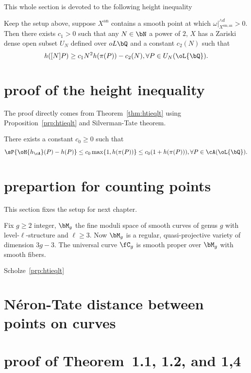 This whole section is devoted to the following height inequality
\begin{prp}\label{prp:htieqlt}
  Keep the setup above, suppose $X^{\mathrm{an}}$ contains a smooth point at which $\omega|_{X^{\mathrm{sm,an}}}^{\wedge d}>0$. Then there exists $c_{1}>0$ such that any $N\in\bN$ a power of $2$, $X$ has a Zariski dense open subset $U_{N}$ defined over $oL{\bQ}$ and a constant $c_{2}(N)$ such that
  \[
    h([N]P)\geq c_{1}N^{2}h(\pi(P))-c_{2}(N), \forall P\in U_{N}(\oL{\bQ}).
  \]
\end{prp}



\section{proof of the height inequality}

The proof directly comes from Theorem~\ref{thm:htieqlt} using Proposition~\ref{prp:htieqlt} and Silverman-Tate theorem.

\begin{thm}
  There exists a constant $c_{0}\geq 0$ such that
  \[
    \sP{\oH{h_{\cA}}(P)-h(P)}\leq c_{0}\max\{1, h(\pi(P))\}\leq c_{0}(1+h(\pi(P))), \forall P\in\cA(\oL{\bQ}).
  \]
\end{thm}


\section{prepartion for counting points}

This section fixes the setup for next chapter.
\begin{stp}
  Fix $g\geq 2$ integer, $\bM_{g}$ the fine moduli space of smooth curves of genus $g$ with level-$\ell$-structure and $\ell\geq 3$. Now $\bM_{g}$ is a regular, quasi-projective variety of dimension $3g-3$. The universal curve $\fC_{g}$ is smooth proper over $\bM_{g}$ with smooth fibers.
\end{stp}


Scholze~\autoref{prp:htieqlt}



\section{N{\'e}ron-Tate distance between points on curves}






\section{proof of Theorem~1.1, 1.2, and 1,4}









